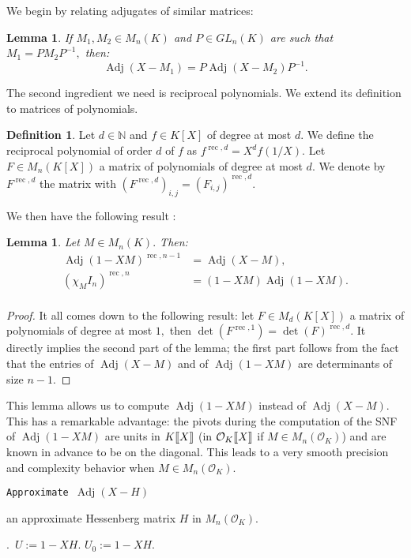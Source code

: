 \documentclass[sigconf]{acmart}
\DeclareMathOperator{\adj}{Adj}
\DeclareMathOperator{\rec}{rec}
\newcommand{\OK}{\mathcal{O}_K}
\newcommand{\llb}{[\mkern-2.5mu[}
\newcommand{\rrb}{]\mkern-2.5mu]}
\newtheorem{lem}[theo]{Lemma}
\theoremstyle{definition}
\newtheorem{deftn}[theo]{Definition}
\begin{document}
We begin by relating adjugates of
similar matrices:

\begin{lem} \label{lem:adjugate_of_similar}
If $M_1,M_2 \in M_n(K)$ and $P \in GL_n (K)$ are such that
$M_1=PM_2P^{-1},$ then:
\[ \adj (X-M_1)=P \adj (X-M_2) P^{-1}. \] 
\end{lem}

The second ingredient we need is reciprocal polynomials.
We extend its definition to matrices of polynomials.
\begin{deftn}
Let $d \in \mathbb{N}$ and $f \in K[X]$ of degree at most $d.$ 
We define the reciprocal polynomial of order $d$ of $f$ as $f^{\rec,d}=X^d f \left( 1/X \right).$
Let $F \in M_n(K[X])$ a matrix of polynomials of degree at most $d.$
We denote by $F^{\rec,d}$ the matrix with $(F^{\rec,d})_{i,j} = (F_{i,j})^{\rec,d}$.
\end{deftn}
We then have the following result :
\begin{lem}
Let $M \in M_n(K).$ Then:
\begin{align*}
\adj(1-XM)^{\rec,n-1}&=\adj(X-M), \\
(\chi_M I_n)^{\rec,n}&=(1-XM) \adj(1-XM).\\
\end{align*}
\end{lem}
\begin{proof}
It all comes down to the following result:
let $F \in M_d(K[X])$ a matrix of polynomials of degree at most $1,$
then $\det (F^{\rec,1})=\det(F)^{\rec,d}.$
It directly implies the second part of the lemma; the first part follows
from the fact that the entries of $\adj(X-M)$ and of $\adj(1-XM)$
are determinants of size $n-1$.
\end{proof}

This lemma allows us to compute $\adj(1-XM)$ instead of $\adj(X-M).$
This has a remarkable advantage: the pivots during the computation of
the SNF of $\adj(1-XM)$ are units in $K\llb X\rrb$ (in $\OK\llb X\rrb$ if $M \in M_n(\OK)$) and are known
in advance to be on the diagonal. This leads to a very smooth
precision and complexity behavior when $M \in M_n(\OK).$ 

\noindent\hrulefill

 {\tt Approximate $\adj (X -H)$ }

 an approximate Hessenberg matrix $H$ in $M_n(\OK).$

\smallskip

.\ $U:=1-XH.$ $U_0:=1-XH.$
\end{document}
